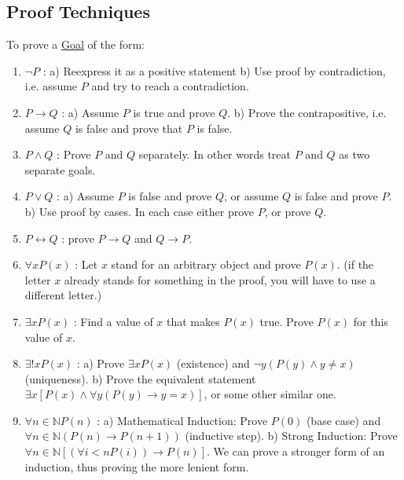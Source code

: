 \documentclass[12pt]{article}
\begin{document}
\begin{flushleft}
	\subsection{Proof Techniques}
	 
	\textbullet \quad To prove a \uline{Goal} of the form:  
	\begin{enumerate}
	\item $\lnot P$  :  a) Reexpress it as a positive statement \linebreak 
							 b) Use proof by contradiction, i.e. assume $P$ and try to reach a contradiction. 
	\item $P \rightarrow Q$  :  a) Assume $P$ is true and prove $Q$. \linebreak 
	b) Prove the contrapositive, i.e. assume $Q$ is false and prove that $P$ is false. 
	\item $P\land Q $  :  Prove $P$ and $Q$ separately. In other words treat $P$ and $Q$ as two separate goals. 
	\item $P \lor Q$  :  a) Assume $P$ is false and prove $Q$, or assume $Q$ is false and prove $P$. \linebreak 
								b) Use proof by cases. In each case either prove $P$, or prove $Q$. 
	\item $P \leftrightarrow Q$  :  prove $P \rightarrow Q$ and $Q \rightarrow P $. 
	\item $\forall x P(x)$  :  Let $x$ stand for an arbitrary object and prove $P(x)$. (if the letter $x$ already stands for something in the proof, you will have to use a different letter.) 
	\item $\exists x P(x)$  :  Find a value of $x$ that makes $P(x)$ true. Prove $P(x)$ for this value of $x$. 
	\item $\exists ! xP(x)$  :  \linebreak 
	a) Prove $\exists xP(x)$ (existence) and $\displaystyle \lnot y\left(P(y) \land y \neq x \right) $ (uniqueness). \linebreak 							
	b) Prove the equivalent statement $ \exists x \left[P(x) \land \forall y(P(y) \rightarrow y = x) \right] $, or some other similar one. 
	\item $\forall n \in \mathbb{N} P(n)$  :  a) Mathematical Induction: Prove $P(0)$ (base case) and $\displaystyle \forall n \in \mathbb{N} (P(n) \rightarrow P(n+1)) $ (inductive step). \linebreak 
															  b) Strong Induction: Prove $\displaystyle \forall n \in \mathbb{N} \left[ (\forall i < n P(i)) \rightarrow P(n) \right] $. \linebreak
	We can prove a stronger form of an induction, thus proving the more lenient form. \linebreak 
	\end{enumerate} 
	 

\end{flushleft}
\end{document}
